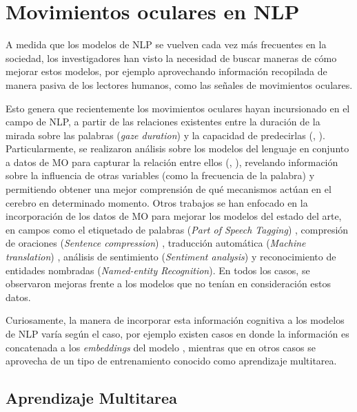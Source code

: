 \section{Movimientos oculares en NLP}

A medida que los modelos de NLP se vuelven cada vez más frecuentes en la sociedad, los investigadores han visto la necesidad de buscar maneras de cómo mejorar estos modelos, por ejemplo aprovechando información recopilada de manera pasiva de los lectores humanos, como las señales de movimientos oculares.

Esto genera que recientemente los movimientos oculares hayan incursionado en el campo de NLP, a partir de las relaciones existentes entre la duración de la mirada sobre las palabras (\textit{gaze duration}) y la capacidad de predecirlas (\cite{Rayner1998}, \cite{Reinhold2006}). Particularmente, se realizaron análisis sobre los modelos del lenguaje en conjunto a datos de MO para capturar la relación entre ellos (\cite{Bianchi2020}, \cite{Hofmann2017}), revelando información sobre la influencia de otras variables (como la frecuencia de la palabra) y permitiendo obtener una mejor comprensión de qué mecanismos actúan en el cerebro en determinado momento. Otros trabajos se han enfocado en la incorporación de los datos de MO para mejorar los modelos del estado del arte, en campos como el etiquetado de palabras (\textit{Part of Speech Tagging}) \parencite{barrett-etal-2016-weakly}, compresión de oraciones (\textit{Sentence compression}) \parencite{klerke2016improvingsentencecompressionlearning}, traducción automática (\textit{Machine translation}) \parencite{sajjad-etal-2016-eyes}, análisis de sentimiento (\textit{Sentiment analysis}) \parencite{mishra2017} y reconocimiento de entidades nombradas (\textit{Named-entity Recognition}). \parencite{hollenstein2019} En todos los casos, se observaron mejoras frente a los modelos que no tenían en consideración estos datos.

Curiosamente, la manera de incorporar esta información cognitiva a los modelos de NLP varía según el caso, por ejemplo existen casos en donde la información es concatenada a los \textit{embeddings} del modelo \parencite{hollenstein2019}, mientras que en otros casos se aprovecha de un tipo de entrenamiento conocido como aprendizaje multitarea. \parencite{klerke2016improvingsentencecompressionlearning}

\subsection{Aprendizaje Multitarea}

